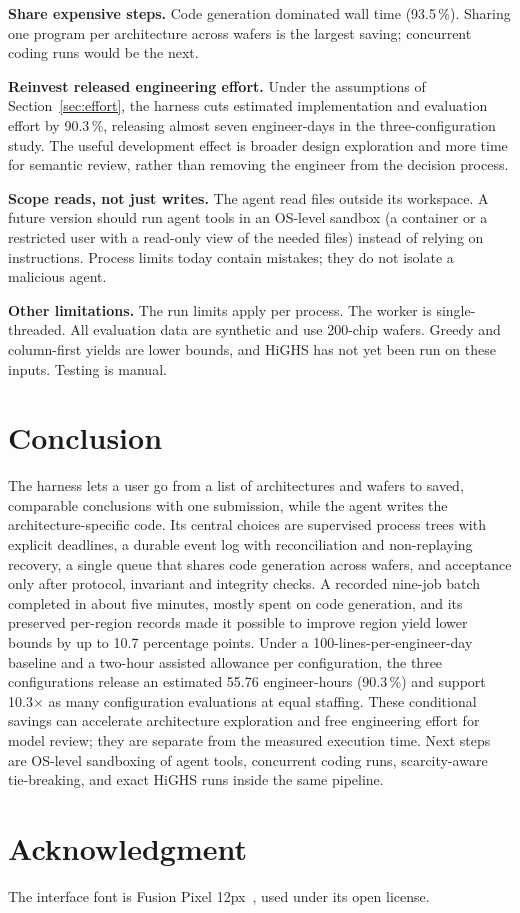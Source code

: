 \documentclass[conference]{IEEEtran}
\begin{document}
\textbf{Share expensive steps.} Code generation dominated wall time (93.5\,\%).
Sharing one program per architecture across wafers is the largest saving;
concurrent coding runs would be the next.

\textbf{Reinvest released engineering effort.} Under the assumptions of
Section~\ref{sec:effort}, the harness cuts estimated implementation and
evaluation effort by 90.3\,\%, releasing almost seven engineer-days in the
three-configuration study. The useful development effect is broader design
exploration and more time for semantic review, rather than removing the
engineer from the decision process.

\textbf{Scope reads, not just writes.} The agent read files outside its
workspace. A future version should run agent tools in an OS-level sandbox
(a container or a restricted user with a read-only view of the needed files)
instead of relying on instructions. Process limits today contain mistakes;
they do not isolate a malicious agent.

\textbf{Other limitations.} The run limits apply per process. The worker is
single-threaded. All evaluation data are synthetic and use 200-chip wafers.
Greedy and column-first yields are lower bounds, and HiGHS has not yet been
run on these inputs. Testing is manual.

\section{Conclusion}

The harness lets a user go from a list of architectures and wafers to saved,
comparable conclusions with one submission, while the agent writes the
architecture-specific code. Its central choices are supervised process trees
with explicit deadlines, a durable event log with reconciliation and
non-replaying recovery, a single queue that shares code generation across
wafers, and acceptance only after protocol, invariant and integrity checks.
A recorded nine-job batch completed in about five minutes, mostly spent
on code generation, and its preserved per-region records made it possible
to improve region yield lower bounds by up to 10.7 percentage points.
Under a 100-lines-per-engineer-day baseline and a two-hour assisted allowance
per configuration, the three configurations release an estimated 55.76
engineer-hours (90.3\,\%) and support 10.3$\times$ as many configuration
evaluations at equal staffing. These conditional savings can accelerate
architecture exploration and free engineering effort for model review;
they are separate from the measured execution time. Next steps are
OS-level sandboxing of agent tools, concurrent coding runs,
scarcity-aware tie-breaking, and exact HiGHS runs inside the same pipeline.

\section*{Acknowledgment}
The interface font is Fusion Pixel
12px~\cite{fusionpixel}, used under its open license.



\end{document}
